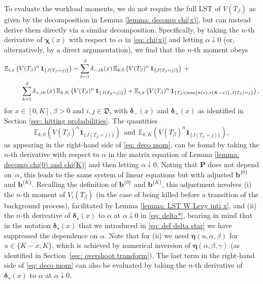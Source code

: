\documentclass[reqno,12pt]{amsart}
\newcommand{\bs}{\boldsymbol}
\newcommand{\defD}{{\mathfrak D}}
\begin{document}
{To evaluate the workload moments, we do not require the full LST of $V(T_\beta)$ as given by the decomposition in Lemma \ref{lemma: decomp chi(x)}, but can instead derive them directly via a similar decomposition. Specifically, by taking the $n$-th derivative of ${\bs \chi}(x)$ with respect to $\alpha$ in \eqref{eq: chi(x)} and letting $\alpha\downarrow0$ (or, alternatively, by a direct argumentation), we find that the $n$-th moment obeys
\begin{align}
    \mathbb{E}_{i,x}&\left(V(T_\beta)^n\,{\bs 1}_{\{J(T_\beta = j)\}}\right) = \sum_{k=1}^d\delta_{-,ik}(x)\,\mathbb{E}_{k,0}\left(V(T_\beta)^n\,{\bs 1}_{\{J(T_\beta = j)\}}\right)\:+\notag \\ &\quad\sum_{k=1}^d\delta_{+,ik}\,(x)\,\mathbb{E}_{k,K}\left(V(T_\beta)^n\,{\bs 1}_{\{J(T_\beta = j)\}}\right)+ \mathbb{E}_{i,x}\left(V(T_\beta)^n\,{\bs 1}_{\{T_\beta<\min\{\sigma(x), \tau(K-x)\}, J(T_\beta) =j\}}\right), \label{eq: deco mom}
\end{align}
for $x\in[0,K], \beta>0$ and $i,j\in\defD $, with ${\bs \delta}_-(x)$ and ${\bs \delta}_+(x)$ as identified in Section \ref{sec: hitting probabilities}. 
The quantities
\[\mathbb{E}_{k,0}\left(V(T_\beta)^n{\bs 1}_{\{J(T_\beta = j)\}}\right)\:\:\mbox{and}\:\:\mathbb{E}_{k,K}\left(V(T_\beta)^n{\bs 1}_{\{J(T_\beta = j)\}}\right),\]
as appearing in the right-hand side of \eqref{eq: deco mom},
can be found by taking the $n$-th derivative with respect to $\alpha$ in the matrix equation of Lemma \ref{lemma: decomp chi(0) and chi(K)} and then letting $\alpha\downarrow0$. Noting that ${\bs P}$ does not depend on~$\alpha$, this leads to the same system of linear equations but with  adjusted  ${\bs b}^{\{0\}}$ and ${\bs b}^{\{K\}}$. Recalling the definition of ${\bs b}^{\{0\}}$ and ${\bs b}^{\{K\}}$, this adjustment involves (i) the $n$-th moment of  $V_i(T_\beta)$  (in the case of being killed before a transition of the background process), facilitated by Lemma \ref{lemma: LST W Levy inti x}, and (ii) the $n$-th derivative of ${\bs \delta}_\star(x)$ to $\alpha$ at $\alpha\downarrow 0$  in \eqref{eq: delta*}, bearing in mind that in the notation ${\bs \delta}_\star(x)$ that we introduced in \eqref{eq: def delta star} we have suppressed the dependence on $\alpha$.  Note that for (ii) we need ${\bs \eta}(u,\alpha,\beta)$ for $u\in\{K-x,K\}$, which is achieved by numerical inversion of ${\bs \eta}(\alpha,\beta, \gamma)$ (as identified in Section~\ref{sec: overshoot transform}).
The last term in the right-hand side of \eqref{eq: deco mom} can also be evaluated by taking the $n$-th derivative of ${\bs \delta}_\star(x)$ to $\alpha$ at $\alpha\downarrow 0$.

}
\end{document}
